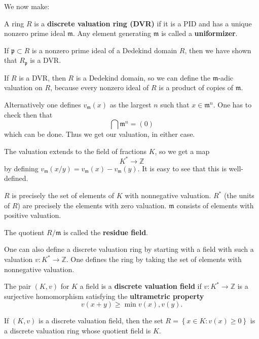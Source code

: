 We now make:

\begin{definition} 
A ring $R$ is a \textbf{discrete valuation ring (DVR)} if it is a PID and has a
unique nonzero prime ideal $\mathfrak{m}$. Any element generating
$\mathfrak{m}$ is called a \textbf{uniformizer}.	
\end{definition} 


If $\mathfrak{p} \subset R$ is a nonzero prime ideal of a Dedekind domain $R$,
then we have shown that $R_{\mathfrak{p}}$ is a DVR. 

If $R$ is a DVR, then $R$ is a Dedekind domain, so we can define the
$\mathfrak{m}$-adic valuation on $R$, because every nonzero ideal of $R$ is a  product
of copies of $\mathfrak{m}$.

Alternatively one defines $v_{\mathfrak{m}}(x)$ as the largest $n$ such that $x
\in \mathfrak{m}^n$.
One has to check then that
\[ \bigcap \mathfrak{m}^n = (0) \]
which can be done.
Thus we get our valuation, in either case.

The valuation extends to the field of fractions $K$, so we get a map
\[ K^* \to \mathbb{Z}  \]
by defining $v_{\mathfrak{m}}(x/y) = v_{\mathfrak{m}}(x) -
v_{\mathfrak{m}}(y)$. It is easy to see that this is well-defined.  

\begin{remark} 
$R$ is precisely the set of elements of $K$ with nonnegative valuation.  $R^*$
(the units of $R$) are precisely the elements with zero valuation.
$\mathfrak{m}$ consists of elements with positive valuation. 
\end{remark} 

\begin{definition} 
The quotient $R/\mathfrak{m}$ is called the \textbf{residue field}.
\end{definition} 

One can also define a discrete valuation ring by starting with a field with
such a valuation $v: K^* \to \mathbb{Z}$. One defines the ring by taking the
set of elements with nonnegative valuation. 

\begin{definition} 
The pair $(K, v)$ for $K$ a field is a \textbf{discrete valuation field} if $v:
K^* \to \mathbb{Z}$ is a surjective homomorphism satisfying
the \textbf{ultrametric property}
\[ v(x+y) \geq \min v(x), v(y).  \]
\end{definition} 

\begin{exercise} 
If $(K,v)$ is a discrete valuation field, then the set $R=\left\{x \in K:
v(x) \geq 0\right\}$ is a discrete valuation ring whose quotient field is $K$. 
\end{exercise} 

